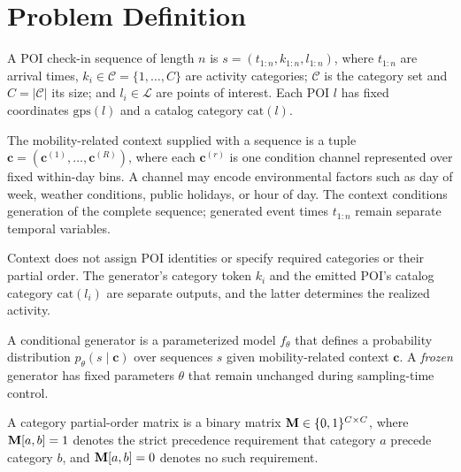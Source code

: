 \section{Problem Definition}
\label{sec:problem}

\begin{definition}
A POI check-in sequence of length $n$ is
$s=(t_{1:n},k_{1:n},l_{1:n})$, where $t_{1:n}$ are arrival times,
$k_i \in \mathcal{C}=\{1,\dots,C\}$ are activity categories; $\mathcal{C}$ is
the category set and $C=|\mathcal{C}|$ its size; and
$l_i \in \mathcal{L}$ are points of interest. Each POI $l$ has fixed
coordinates $\mathrm{gps}(l)$ and a catalog category $\mathrm{cat}(l)$.
\end{definition}

\begin{definition}
The mobility-related context supplied with a sequence is a tuple
$\mathbf{c}=(\mathbf{c}^{(1)},\dots,\mathbf{c}^{(R)})$, where each
$\mathbf{c}^{(r)}$ is one condition channel represented over fixed within-day
bins. A channel may encode environmental factors such as day of week, weather
conditions, public holidays, or hour of day. The context conditions generation
of the complete sequence; generated event times $t_{1:n}$ remain separate
temporal variables.
\end{definition}

Context does not assign POI identities or specify required categories or their
partial order. The generator's category token $k_i$ and the emitted POI's
catalog category $\mathrm{cat}(l_i)$ are separate outputs, and the latter
determines the realized activity.

\begin{definition}
A conditional generator is a parameterized model $f_\theta$ that defines a
probability distribution $p_\theta(s\mid\mathbf{c})$ over sequences $s$ given
mobility-related context $\mathbf{c}$. A \emph{frozen} generator has fixed
parameters $\theta$ that remain unchanged during sampling-time control.
\end{definition}

\begin{definition}
A category partial-order matrix is a binary matrix
$\mathbf{M}\in\{0,1\}^{C\times C}$, where $\mathbf{M}[a,b]=1$ denotes the strict
precedence requirement that category $a$ precede category $b$, and
$\mathbf{M}[a,b]=0$ denotes no such requirement.
\end{definition}

